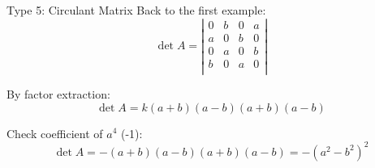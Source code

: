 \documentclass{beamer}
\begin{document}
\begin{frame}{Type 5: Circulant Matrix}
Back to the first example:
\begin{equation*}
    \det A=\left| \begin{matrix}
        0&		b&		0&		a\\
        a&		0&		b&		0\\
        0&		a&		0&		b\\
        b&		0&		a&		0\\
    \end{matrix} \right|
    \end{equation*}

    By factor extraction:
    \begin{equation*}
        \det A=k\left( a+b \right) \left( a-b \right) \left( a+b \right) \left( a-b \right)
    \end{equation*}

    Check coefficient of $a^4$ (-1):
    \begin{equation*}
        \det A=-\left( a+b \right) \left( a-b \right) \left( a+b \right) \left( a-b \right)=-\left( a^2-b^2 \right) ^2
    \end{equation*}
\end{frame}
\end{document}
